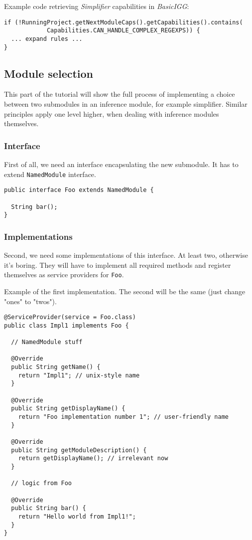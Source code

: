 \documentclass[a4paper,10pt,oneside]{article}
\begin{document}
Example code retrieving \textit{Simplifier} capabilities
in \textit{BasicIGG}:
\begin{verbatim}
if (!RunningProject.getNextModuleCaps().getCapabilities().contains(
            Capabilities.CAN_HANDLE_COMPLEX_REGEXPS)) {
  ... expand rules ...
}
\end{verbatim}

\subsection*{Module selection}

\par 
  This part of the tutorial will show the full process of implementing a choice
  between two submodules in an inference module, for example simplifier. Similar
  principles apply one level higher, when dealing with inference modules themselves.


\subsubsection*{Interface}

\par 
  First of all, we need an interface encapsulating the new submodule. It has to
  extend \texttt{NamedModule} interface.


\begin{verbatim}
public interface Foo extends NamedModule {

  String bar();
}
\end{verbatim}

\subsubsection*{Implementations}

\par 
  Second, we need some implementations of this interface. At least two, otherwise
  it's boring.
  They will have to implement all required methods and register themselves as
  service providers for \texttt{Foo}.


Example of the first implementation. The second will be the same (just change "ones" to "twos").
\begin{verbatim}
@ServiceProvider(service = Foo.class)
public class Impl1 implements Foo {

  // NamedModule stuff

  @Override
  public String getName() {
    return "Impl1"; // unix-style name
  }

  @Override
  public String getDisplayName() {
    return "Foo implementation number 1"; // user-friendly name
  }

  @Override
  public String getModuleDescription() {
    return getDisplayName(); // irrelevant now
  }

  // logic from Foo

  @Override
  public String bar() {
    return "Hello world from Impl1!";
  }
}
\end{verbatim}
\end{document}
